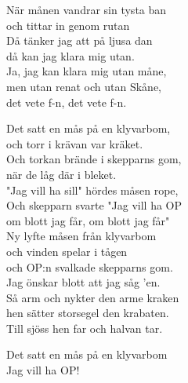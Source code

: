 \documentclass[a6paper,10pt]{article}
\begin{document}
\setlength{\oddsidemargin}{-0.47in}
\noindent
\begin{center}
\end{center}
\begin{lyrics}
När månen vandrar sin tysta ban \\
och tittar in genom rutan \\
Då tänker jag att på ljusa dan \\
då kan jag klara mig utan. \\
Ja, jag kan klara mig utan måne, \\
men utan renat och utan Skåne, \\
det vete f-n, det vete f-n. 
\end{lyrics}
\begin{center}
\end{center}
\begin{lyrics}
Det satt en mås på en klyvarbom, \\
och torr i krävan var kräket. \\
Och torkan brände i skepparns gom, \\
när de låg där i bleket. \\
"Jag vill ha sill" hördes måsen rope, \\
Och skepparn svarte "Jag vill ha OP \\
om blott jag får, om blott jag får" 
\vspace{5pt}\\
Ny lyfte måsen från klyvarbom \\
och vinden spelar i tågen \\
och OP:n svalkade skepparns gom. \\
Jag önskar blott att jag såg 'en. \\
Så arm och nykter den arme kraken \\
hen sätter storsegel den krabaten. \\
Till sjöss hen far och halvan tar. 
\end{lyrics}

\begin{center}
\end{center}
\begin{lyrics}
Det satt en mås på en klyvarbom\\
Jag vill ha OP! 
\end{lyrics}
\end{document}
